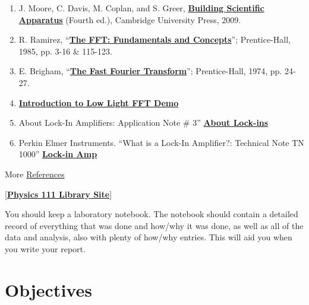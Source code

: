 \documentclass{../lab}
\begin{document}
\begin{enumerate}
    \item J. Moore, C. Davis, M. Coplan, and S. Greer, \href{http://physics111.lib.berkeley.edu/Physics111/Reprints/Apparatus\%20Book/Building-Scientific-Apparatus--Moore.pdf}{\textbf{Building Scientific Apparatus}} (Fourth ed.), Cambridge University Press, 2009.

    \item R. Ramirez, ``\href{http://physics111.lib.berkeley.edu/Physics111/Reprints/LLS/01-The\_FFT.pdf}{\textbf{The FFT: Fundamentals and Concepts}}''; Prentice-Hall, 1985, pp. 3-16 \& 115-123.

    \item E. Brigham, ``\href{http://physics111.lib.berkeley.edu/Physics111/Reprints/LLS/02-The\_Fast\_Fourier\_Transform.pdf}{\textbf{The Fast Fourier Transform}}''; Prentice-Hall, 1974, pp. 24-27.

    \item \href{http://physics111.lib.berkeley.edu/Physics111/Reprints/LLS/03-LowLight\_FFT\_Demo.pdf}{\textbf{Introduction to Low Light FFT Demo}}

    \item About Lock-In Amplifiers: Application Note \# 3” \href{http://physics111.lib.berkeley.edu/Physics111/Reprints/LLS/About-Lock-Ins.pdf}{\textbf{About Lock-ins}}

    \item Perkin Elmer Instruments. ``What is a Lock-In Amplifier?: Technical Note TN 1000'' \href{http://physics111.lib.berkeley.edu/Physics111/Reprints/LLS/Lock-in-Amp.pdf}{\textbf{Lock-in Amp}}

\end{enumerate}

\noindent More \hyperref[sec:References]{References}

[\href{\LabReprints}{\textbf{Physics 111 Library Site}}]

You should keep a laboratory notebook. The notebook should contain a detailed record of everything that was done and how/why it was done, as well as all of the data and analysis, also with plenty of how/why entries. This will aid you when you write your report.

\section{Objectives}
\end{document}
